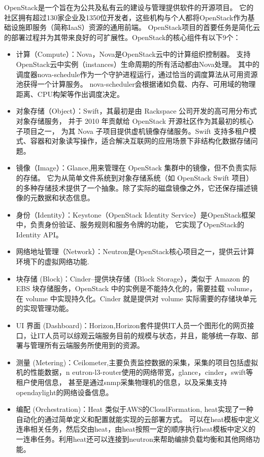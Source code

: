 OpenStack是一个旨在为公共及私有云的建设与管理提供软件的开源项目。
它的社区拥有超过130家企业及1350位开发者，这些机构与个人都将OpenStack作为基础设施即服务（简称IaaS）资源的通用前端。
OpenStack项目的首要任务是简化云的部署过程并为其带来良好的可扩展性。OpenStack的核心组件有以下9个：
\begin{itemize}
\item 计算（Compute）：Nova，Nova是OpenStack云中的计算组织控制器。
支持OpenStack云中实例（instances）生命周期的所有活动都由Nova处理。
其中的调度器nova-schedule作为一个守护进程运行，通过恰当的调度算法从可用资源池获得一个计算服务。
nova-scheduler会根据诸如负载、内存、可用域的物理距离、CPU构架等作出调度决定。
\item 对象存储（Object）：Swift，其最初是由 Rackspace 公司开发的高可用分布式对象存储服务，
并于 2010 年贡献给 OpenStack 开源社区作为其最初的核心子项目之一，
为其 Nova 子项目提供虚机镜像存储服务。Swift 支持多租户模式、容器和对象读写操作，适合解决互联网的应用场景下非结构化数据存储问题。
\item 镜像（Image）：Glance,用来管理在 OpenStack 集群中的镜像，但不负责实际的存储。
它为从简单文件系统到对象存储系统（如 OpenStack Swift 项目）的多种存储技术提供了一个抽象。除了实际的磁盘镜像之外，它还保存描述镜像的元数据和状态信息。
\item 身份（Identity）：Keystone（OpenStack Identity Service）是OpenStack框架中，负责身份验证、服务规则和服务令牌的功能， 它实现了OpenStack的Identity API。
\item 网络地址管理（Network）：Neutron是OpenStack核心项目之一，提供云计算环境下的虚拟网络功能.
\item 块存储 (Block)：Cinder--提供块存储（Block Storage），类似于 Amazon 的 EBS 块存储服务，OpenStack 中的实例是不能持久化的，需要挂载 volume，在 volume 中实现持久化。Cinder 就是提供对 volume 实际需要的存储块单元的实现管理功能。
\item UI 界面 (Dashboard)：Horizon,Horizon套件提供IT人员一个图形化的网页接口，让IT人员可以综观云端服务目前的规模与状态，并且，能够统一存取、部署与管理所有云端服务所使用到的资源。
\item 测量 (Metering)：Ceilometer,主要负责监控数据的采集，采集的项目包括虚拟机的性能数据，n
eutron-l3-router使用的网络带宽，glance，cinder，swift等租户使用信息，
甚至是通过snmp采集物理机的信息，以及采集支持opendaylight的网络设备信息。
\item 编配 (Orchestration)：Heat 类似于AWS的CloudFormation, heat实现了一种自动化的通过简单定义和配置就能实现的云部署方式。
可以在heat模板中定义连串相关任务，然后交由heat，由heat按照一定的顺序执行heat模板中定义的一连串任务。利用heat还可以连接到neutron来帮助编排负载均衡和其他网络功能。
\end{itemize}
